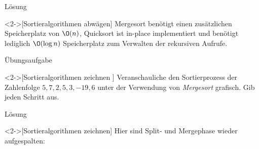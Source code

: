 \begin{frame}[c]{Lösung}
    \begin{solve}<2->[Sortieralgorithmen abwägen]
        \pause{}Mergesort benötigt einen zusätzlichen Speicherplatz von \(\O(n)\), Quicksort ist in-place implementiert und benötigt lediglich \(\O(\log n)\) Speicherplatz zum Verwalten der rekursiven Aufrufe.
    \end{solve}
\end{frame}

\begin{frame}[c]{Übungsaufgabe}
    \begin{exercise}<2->[Sortieralgorithmen zeichnen ]
        \pause{}Veranschauliche den Sortierprozess der Zahlenfolge \(5,7,2,5,3,-19,6\) unter der Verwendung von \emph{Mergesort} grafisch.\pause{} Gib jeden Schritt aus.
    \end{exercise}
\end{frame}

\begin{frame}[c]{Lösung}
    \begin{solve}<2->[Sortieralgorithmen zeichnen]
        \pause{}Hier sind Split- und Mergephase wieder aufgespalten:\pause{}
\begin{center}
    \qquad~~\qquad\pause{}
\end{center}
    \end{solve}
\end{frame}

